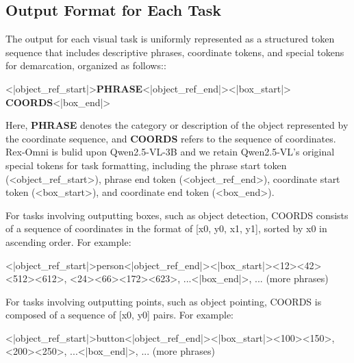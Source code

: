 \subsection{Output Format for Each Task}  
The output for each visual task is uniformly represented as a structured token sequence that includes descriptive phrases, coordinate tokens, and special tokens for demarcation, organized as follows::
\begin{tcolorbox}[
  colback=lightblue!5,       %
  colframe=blue!20!black,     %
  coltitle=black,             %
  colbacktitle=lightblue!20, %
  title=Basic output format of Rex-Omni,
  fonttitle=\bfseries,
  boxrule=1.0pt
]
<|object\_ref\_start|>\textbf{PHRASE}<|object\_ref\_end|><|box\_start|> \textbf{COORDS}<|box\_end|>
\end{tcolorbox}

\noindent Here, \textbf{PHRASE} denotes the category or description of the object represented by the coordinate sequence, and \textbf{COORDS} refers to the sequence of coordinates.  Rex-Omni is bulid upon Qwen2.5-VL-3B and we retain Qwen2.5-VL's original special tokens for task formatting, including the phrase start token (<object\_ref\_start>), phrase end token (<object\_ref\_end>), coordinate start token (<box\_start>), and coordinate end token (<box\_end>).

\noindent For tasks involving outputting boxes, such as object detection, COORDS consists of a sequence of coordinates in the format of [x0, y0, x1, y1], sorted by x0 in ascending order. For example:

\begin{tcolorbox}[
  colback=lightblue!5,       %
  colframe=blue!20!black,     %
  coltitle=black,             %
  colbacktitle=lightblue!20, %
  title=An example of a task for outputting bounding boxes,
  fonttitle=\bfseries,
  boxrule=1.0pt
]
<|object\_ref\_start|>person<|object\_ref\_end|><|box\_start|><12><42><512><612>, <24><66><172><623>, ...<|box\_end|>, ... (more phrases)
\end{tcolorbox}

\noindent For tasks involving outputting points, such as object pointing, COORDS is composed of a sequence of [x0, y0] pairs. For example:

\begin{tcolorbox}[
  colback=lightblue!5,       %
  colframe=blue!20!black,     %
  coltitle=black,             %
  colbacktitle=lightblue!20, %
  title=An example of a task for outputting points,
  fonttitle=\bfseries,
  boxrule=1.0pt
]
<|object\_ref\_start|>button<|object\_ref\_end|><|box\_start|><100><150>,<200><250>, ...<|box\_end|>, ... (more phrases)
\end{tcolorbox}


